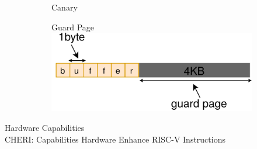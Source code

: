 \documentclass[xcolor=table,bigger,unknownkeysallowed]{beamer}
\begin{document}
\begin{frame}
\begin{overprint}

	\begin{figure}
		\centering
		\begin{subfigure}{.48\linewidth}
			\centering
			 Canary\\
		\end{subfigure}
		\begin{subfigure}{.48\linewidth}	
			\centering
			 Guard Page\\
			\includegraphics[width=.7\columnwidth]{fig/gp.png}
		\end{subfigure}
	\end{figure}

	 Hardware Capabilities\\
	CHERI: Capabilities Hardware Enhance RISC-V Instructions
\end{overprint}

\end{frame}
\end{document}
